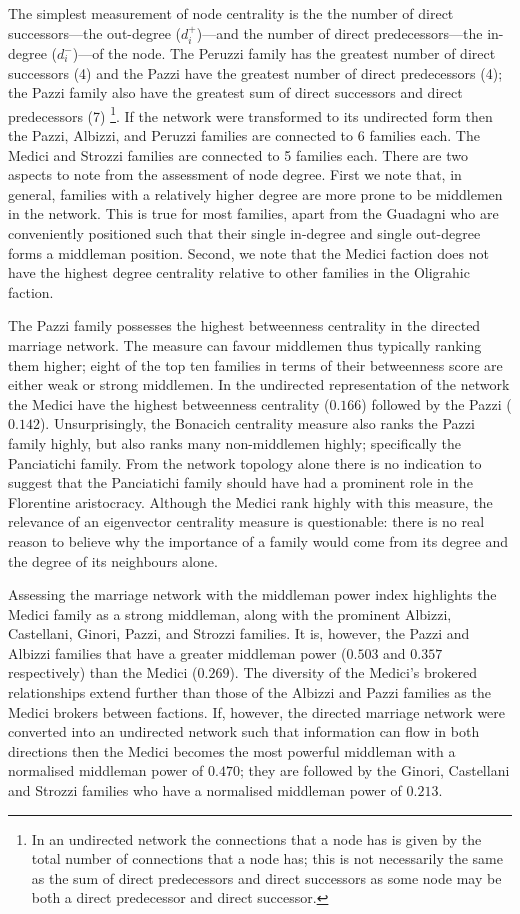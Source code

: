 \documentclass[11pt,fleqn]{article}
\begin{document}
The simplest measurement of node centrality is the the number of direct successors---the out-degree ($d^+_i$)---and the number of direct predecessors---the in-degree ($d^-_i$)---of the node. The Peruzzi family has the greatest number of direct successors (4) and the Pazzi have the greatest number of direct predecessors (4); the Pazzi family also have the greatest sum of direct successors and direct predecessors (7) \footnote{In an undirected network the connections that a node has is given by the total number of connections that a node has; this is not necessarily the same as the sum of direct predecessors and direct successors as some node may be both a direct predecessor and direct successor.}. If the network were transformed to its undirected form then the Pazzi, Albizzi, and Peruzzi families are connected to 6 families each. The Medici and Strozzi families are connected to 5 families each. There are two aspects to note from the assessment of node degree. First we note that, in general, families with a relatively higher degree are more prone to be middlemen in the network. This is true for most families, apart from the Guadagni who are conveniently positioned such that their single in-degree and single out-degree forms a middleman position. Second, we note that the Medici faction does not have the highest degree centrality relative to other families in the Oligrahic faction.

The Pazzi family possesses the highest betweenness centrality in the directed marriage network. The measure can favour middlemen thus typically ranking them higher; eight of the top ten families in terms of their betweenness score are either weak or strong middlemen. In the undirected representation of the network the Medici have the highest betweenness centrality ($0.166$) followed by the Pazzi ($0.142$). Unsurprisingly, the Bonacich centrality measure also ranks the Pazzi family highly, but also ranks many non-middlemen highly; specifically the Panciatichi family. From the network topology alone there is no indication to suggest that the Panciatichi family should have had a prominent role in the Florentine aristocracy. Although the Medici rank highly with this measure, the relevance of an eigenvector centrality measure is questionable: there is no real reason to believe why the importance of a family would come from its degree and the degree of its neighbours alone.

Assessing the marriage network with the middleman power index highlights the Medici family as a strong middleman, along with the prominent Albizzi, Castellani, Ginori, Pazzi, and Strozzi families. It is, however, the Pazzi and Albizzi families that have a greater middleman power ($0.503$ and $0.357$ respectively) than the Medici ($0.269$). The diversity of the Medici's brokered relationships extend further than those of the Albizzi and Pazzi families as the Medici brokers between factions. If, however, the directed marriage network were converted into an undirected network such that information can flow in both directions then the Medici becomes the most powerful middleman with a normalised middleman power of $0.470$; they are followed by the Ginori, Castellani and Strozzi families who have a normalised middleman power of $0.213$.
\end{document}
